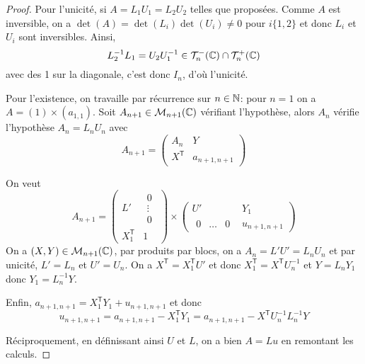\begin{proof}
    Pour l'unicité, si $A=L_{1}U_{1}=L_{2}U_{2}$ telles que proposées. Comme $A$ est inversible, on a $\det(A)=\det(L_{i})\det(U_{i})\neq0$ pour $i\lbrace1,2\rbrace$ et donc $L_{i}$ et $U_{i}$ sont inversibles. Ainsi,
    \begin{equation}
        L_{2}^{-1}L_{1}=U_{2}U_{1}^{-1}\in \mathcal{T}_{n}^{-}(\mathbb{C})\cap\mathcal{T}_{n}^{+}(\mathbb{C})
    \end{equation}
    avec des 1 sur la diagonale, c'est donc $I_{n}$, d'où l'unicité.

    Pour l'existence, on travaille par récurrence sur $n\in\mathbb{N}$: pour $n=1$ on a $A=(1)\times(a_{1,1})$. Soit $A_{n+1}\in \mathcal{M}_{n+1}(\mathbb{C})$ vérifiant l'hypothèse, alors $A_{n}$ vérifie l'hypothèse $A_{n}=L_{n}U_{n}$ avec 
    \begin{equation}
        A_{n+1}=
        \begin{pmatrix}
            A_{n} & Y\\
            X^{\mathsf{T}} & a_{n+1,n+1}
        \end{pmatrix}
    \end{equation}

    On veut 
    \begin{equation}
        A_{n+1}=
        \begin{pmatrix}
            L' &\begin{matrix}
                0\\\vdots\\0
            \end{matrix}\\
            X_{1}^{\mathsf{T}} &1
        \end{pmatrix}\times\begin{pmatrix}
            U' & Y_{1}\\
            \begin{matrix}
                0&\dots&0
            \end{matrix}&u_{n+1,n+1}
        \end{pmatrix}
    \end{equation}
    On a $(X,Y)\in\mathcal{M}_{n+1}(\mathbb{C})$, par produits par blocs, on a $A_{n}=L'U'=L_{n}U_{n}$ et par unicité, $L'=L_{n}$ et $U'=U_{n}$. On a $X^{\mathsf{T}}=X_{1}^{\mathsf{T}}U'$ et donc $X_{1}^{\mathsf{T}}=X^{\mathsf{T}}U_{n}^{-1}$ et $Y=L_{n}Y_{1}$ donc $Y_{1}=L_{n}^{-1}Y$.

    Enfin, $a_{n+1,n+1}=X_{1}^{\mathsf{T}}Y_{1}+u_{n+1,n+1}$ et donc 
    \begin{equation}
        u_{n+1,n+1}=a_{n+1,n+1}-X_{1}^{\mathsf{T}}Y_{1}=a_{n+1,n+1}-X^{\mathsf{T}}U_{n}^{-1}L_{n}^{-1}Y
    \end{equation}

    Réciproquement, en définissant ainsi $U$ et $L$, on a bien $A=Lu$ en remontant les calculs.
\end{proof}

